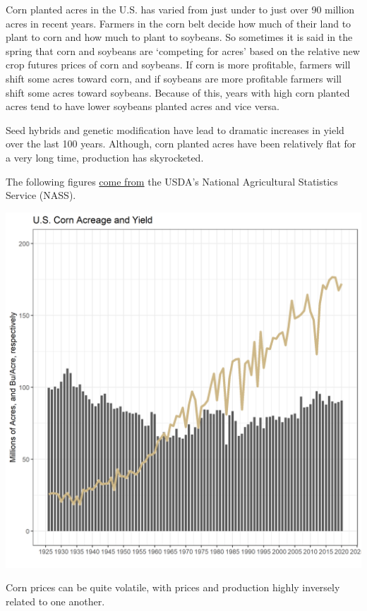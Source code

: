 \documentclass[
]{book}
\begin{document}
Corn planted acres in the U.S. has varied from just under to just over 90 million acres in recent years. Farmers in the corn belt decide how much of their land to plant to corn and how much to plant to soybeans. So sometimes it is said in the spring that corn and soybeans are `competing for acres' based on the relative new crop futures prices of corn and soybeans. If corn is more profitable, farmers will shift some acres toward corn, and if soybeans are more profitable farmers will shift some acres toward soybeans. Because of this, years with high corn planted acres tend to have lower soybeans planted acres and vice versa.

Seed hybrids and genetic modification have lead to dramatic increases in yield over the last 100 years. Although, corn planted acres have been relatively flat for a very long time, production has skyrocketed.

The following figures \href{http://www.ers.usda.gov/topics/crops/corn/background.aspx}{come from} the USDA's National Agricultural Statistics Service (NASS).

\href{https://quickstats.nass.usda.gov/}{\includegraphics{assets/PrimerforGrain_CornAcandY.png}}

Corn prices can be quite volatile, with prices and production highly inversely related to one another.
\end{document}
